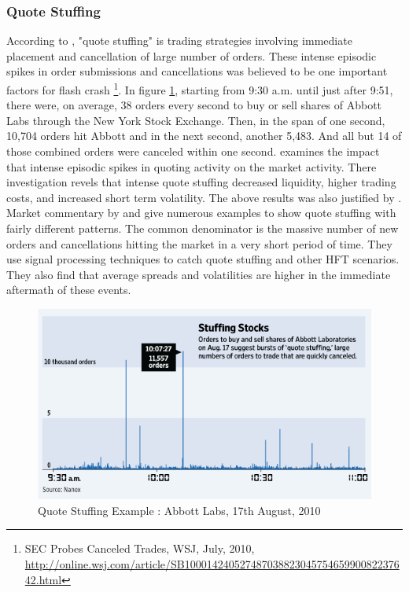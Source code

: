 \documentclass[12pt,a4paper]{article}
\numberwithin{equation}{section}
\numberwithin{figure}{section}
\numberwithin{table}{section}
\begin{document}
\subsubsection{Quote Stuffing}
According to \citet{NANEX2010}, "quote stuffing" is trading strategies involving immediate placement and cancellation of large number of orders. These intense episodic spikes in order submissions and cancellations was believed to be one important factors for flash crash \footnote{SEC Probes Canceled Trades, WSJ, July, 2010, \url{http://online.wsj.com/article/SB10001424052748703882304575465990082237642.html}}. In figure \ref{fig:QS}, starting from 9:30 a.m. until just after 9:51, there were, on average, 38 orders every second to buy or sell shares of Abbott Labs through the New York Stock Exchange. Then, in the span of one second, 10,704 orders hit Abbott and in the next second, another 5,483. And all but 14 of those combined orders were canceled within one second. \citet{egginton2011} examines the impact that intense episodic spikes in quoting activity on the market activity. There investigation revels that intense quote stuffing decreased liquidity, higher trading costs, and increased short term volatility. The above results was also justified by \citet{hasbrouck2012}. Market commentary by \citet{AES2012I} and \citet{AES2012II} give numerous examples to show quote stuffing with fairly different patterns. The common denominator is the massive number of new orders and cancellations hitting the market in a very short period of time. They use signal processing techniques to catch quote stuffing and other HFT scenarios. They also find that average spreads and volatilities are higher in the immediate aftermath of these events.
\begin{figure}[ht]
\begin{center}
\includegraphics[width=\textwidth]{QS}
\caption{Quote Stuffing Example : Abbott Labs, 17th August, 2010 \citep{NANEX2010}}
\label{fig:QS}
\end{center}
\end{figure}
\end{document}
